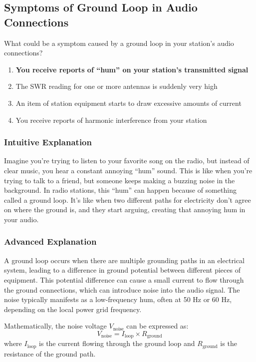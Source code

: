 \subsection{Symptoms of Ground Loop in Audio Connections}
\label{G4C10}

\begin{tcolorbox}[colback=gray!10!white,colframe=black!75!black,title=G4C10]
What could be a symptom caused by a ground loop in your station’s audio connections?
\begin{enumerate}[label=\Alph*,noitemsep]
    \item \textbf{You receive reports of “hum” on your station’s transmitted signal}
    \item The SWR reading for one or more antennas is suddenly very high
    \item An item of station equipment starts to draw excessive amounts of current
    \item You receive reports of harmonic interference from your station
\end{enumerate}
\end{tcolorbox}

\subsubsection{Intuitive Explanation}
Imagine you’re trying to listen to your favorite song on the radio, but instead of clear music, you hear a constant annoying “hum” sound. This is like when you’re trying to talk to a friend, but someone keeps making a buzzing noise in the background. In radio stations, this “hum” can happen because of something called a ground loop. It’s like when two different paths for electricity don’t agree on where the ground is, and they start arguing, creating that annoying hum in your audio.

\subsubsection{Advanced Explanation}
A ground loop occurs when there are multiple grounding paths in an electrical system, leading to a difference in ground potential between different pieces of equipment. This potential difference can cause a small current to flow through the ground connections, which can introduce noise into the audio signal. The noise typically manifests as a low-frequency hum, often at 50 Hz or 60 Hz, depending on the local power grid frequency.

Mathematically, the noise voltage \( V_{\text{noise}} \) can be expressed as:
\[ V_{\text{noise}} = I_{\text{loop}} \times R_{\text{ground}} \]
where \( I_{\text{loop}} \) is the current flowing through the ground loop and \( R_{\text{ground}} \) is the resistance of the ground path.

